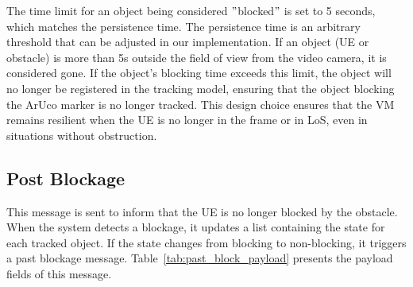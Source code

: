 \begin{table}[H]
    \caption{Components of the Blockage payload.}
    \label{tab:block_payload}
    \centering
\end{table}

The time limit for an object being considered \("\)blocked\("\) is set to 5 seconds, which matches the persistence time.
The persistence time is an arbitrary threshold that can be adjusted in our implementation.
If an object (UE or obstacle) is more than 5s outside the field of view from the video camera, it is considered gone.
If  the object's blocking time exceeds this limit, the object will no longer be registered in the tracking model, ensuring that the object blocking the ArUco marker is no longer tracked.
This design choice ensures that the VM remains resilient when the UE is no longer in the frame or in LoS, even in situations without obstruction.


\subsection{Post Blockage}\label{subsec:past-blockage}
This message is sent to inform that the UE is no longer blocked by the obstacle.
When the system detects a blockage, it updates a list containing the state for each tracked object.
If the state changes from blocking to non-blocking, it triggers a past blockage message.
Table~\ref{tab:past_block_payload} presents the payload fields of this message.


